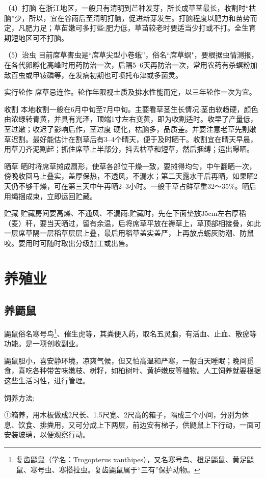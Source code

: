 \documentclass{ctexbook}
\begin{document}
（4）打脑 在浙江地区，一般只有清明到芒种发芽，所长成草茎最长，收割时“枯脑”少，所以，宜在谷雨后至清明打脑，促进新芽发生。打脑程度以肥力和苗势而定，凡肥力足；草苗嫩可多打些;肥力低，草苗较老时要适当少打或不打。全生育期短地区可不打脑。

（5）治虫 目前席草害虫是“席草尖型小卷蛾”，俗名“席草螟"，要根据虫情测报，在各代卵孵化高峰时用药防治一次，后隔5--6天再防治一次，常用农药有杀螟粉加敌百虫或甲铵磷等，在发病初期也可喷托布津或多菌灵。

实行轮作 席草忌连作。轮作年限视土质及排水性能而定，以三年轮作一次为宜。

收割 本地收割一般在6月中旬至7月中旬。主要看草茎生长情况:茎由软趋硬，颜色由浓绿转青黄，并具有光泽，顶端1寸左右变黄，即为收割适时。收早了产量低，茎过嫩；收迟了影响后作，茎过度
硬化，枯脑多，品质差。并要注意老草先割嫩草迟割。最好能估计在割草后有3--4个晴天，便于及时晒干。收割宜在晴天早晨，用草刀齐泥割起；抓住席草上半部分，抖去枯草和短草，然后捆缚；运出曝晒。

晒草 晒时将席草摊成扇形，使草各部位干燥一致，要摊得均匀，中午翻晒一次，傍晚收回马上叠实，盖厚保热，不透风，不漏水；第二天露水干后再晒，如果晒2天仍不够干燥，可在第三天中午再晒2--3小时。一般干草占鲜草重32〜35\%。晒后用绳捆成束，立即运回贮藏。

贮藏 贮藏房间要高燥、不通风、不漏雨;贮藏时，先在下面垫放35cm左右厚稻（麦）秆，要当天晒过，留有余温，后将席草平放在褥草上，草顶部相接叠，如此一层席草隔一层稻草层层上叠，最后用稻草盖实盖严，上再放点蛎灰防潮、防鼠咬。要用时可随时取出分级加工或出售。
\section{养殖业}
\subsection{养鼯鼠}
鼯鼠俗名寒号鸟\footnote{复齿鼯鼠（学名：Trogopterus xanthipes），又名寒号鸟、橙足鼯鼠、黄足鼯鼠、寒号虫、寒搭拉虫。复齿鼯鼠属于“三有”保护动物。}、催生虎等，其粪便入药，取名五灵脂，有活血、止血、散瘀等功能。是一项创收副业。

鼯鼠胆小，喜安静环境，凉爽气候，但又怕高温和严寒，一般白天睡眠；晚间觅食，喜吃各种带苦味嫩枝、树籽，如柏树叶、黄栌嫩皮等植物。人工饲养就要根据这些生活习性，进行管理。

饲养方法:

①箱养，用木板做成2尺长、1.5尺宽、2尺高的箱子，隔成三个小间，分别为休息、饮食、排粪用，又可分成上下两层，前边安有梯子，供鼯鼠上下行动，一面可安装玻璃，以便观察行动。
\end{document}

